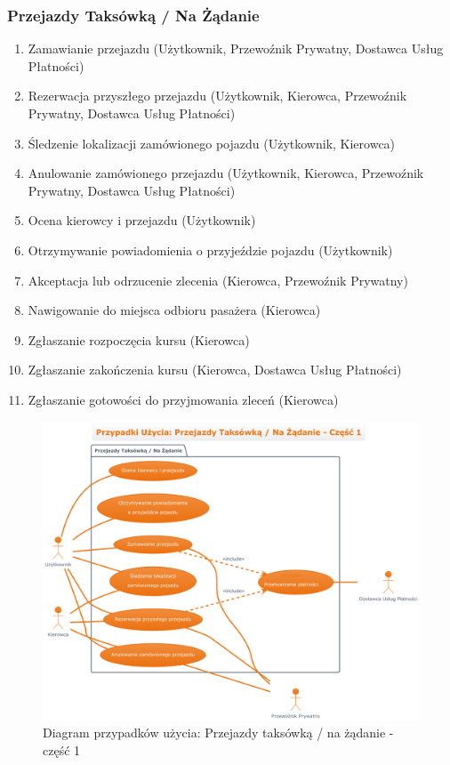 \documentclass[a4paper,12pt]{article}
\begin{document}
\subsubsection{Przejazdy Taksówką / Na Żądanie}
\begin{enumerate}[label=\arabic*.]
    \item Zamawianie przejazdu (Użytkownik, Przewoźnik Prywatny, Dostawca Usług Płatności)
    \item Rezerwacja przyszłego przejazdu (Użytkownik, Kierowca, Przewoźnik Prywatny, Dostawca Usług Płatności)
    \item Śledzenie lokalizacji zamówionego pojazdu (Użytkownik, Kierowca)
    \item Anulowanie zamówionego przejazdu (Użytkownik, Kierowca, Przewoźnik Prywatny, Dostawca Usług Płatności)
    \item Ocena kierowcy i przejazdu (Użytkownik)
    \item Otrzymywanie powiadomienia o przyjeździe pojazdu (Użytkownik)
    \item Akceptacja lub odrzucenie zlecenia (Kierowca, Przewoźnik Prywatny)
    \item Nawigowanie do miejsca odbioru pasażera (Kierowca)
    \item Zgłaszanie rozpoczęcia kursu (Kierowca)
    \item Zgłaszanie zakończenia kursu (Kierowca, Dostawca Usług Płatności)
    \item Zgłaszanie gotowości do przyjmowania zleceń (Kierowca)
\end{enumerate}
\begin{figure}[H]
    \centering
    \includegraphics[width=0.8\linewidth]{diagramy/przypadki_uzycia/images/diagram_przejazdy_taksowka_1.png}
    \caption{Diagram przypadków użycia: Przejazdy taksówką / na żądanie - część 1}
    \label{fig:diag_pt_1}
\end{figure}
\end{document}
